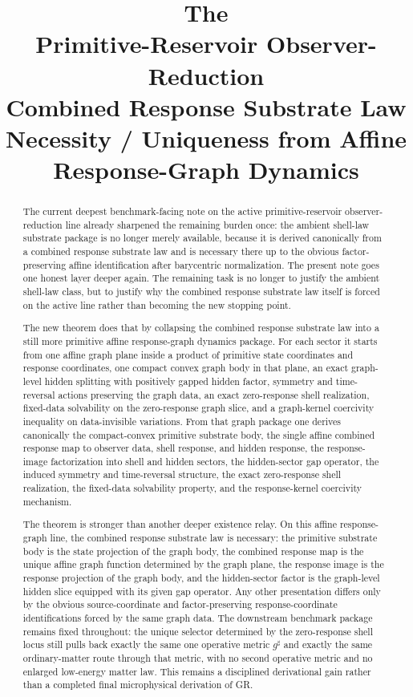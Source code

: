 \documentclass[11pt]{article}
\title{\textbf{The \TheoryName{}}\\[0.4em]
\large Primitive-Reservoir Observer-Reduction\\
\large Combined Response Substrate Law\\
\large Necessity / Uniqueness from Affine Response-Graph Dynamics}
\author{}
\date{}
\newcommand{\CompletedMetric}{g^{\sharp}}
\begin{document}
\maketitle

\begin{abstract}
The current deepest benchmark-facing note on the active primitive-reservoir observer-reduction line already sharpened the remaining burden once: the ambient shell-law substrate package is no longer merely available, because it is derived canonically from a combined response substrate law and is necessary there up to the obvious factor-preserving affine identification after barycentric normalization. The present note goes one honest layer deeper again. The remaining task is no longer to justify the ambient shell-law class, but to justify why the combined response substrate law itself is forced on the active line rather than becoming the new stopping point.

The new theorem does that by collapsing the combined response substrate law into a still more primitive affine response-graph dynamics package. For each sector it starts from one affine graph plane inside a product of primitive state coordinates and response coordinates, one compact convex graph body in that plane, an exact graph-level hidden splitting with positively gapped hidden factor, symmetry and time-reversal actions preserving the graph data, an exact zero-response shell realization, fixed-data solvability on the zero-response graph slice, and a graph-kernel coercivity inequality on data-invisible variations. From that graph package one derives canonically the compact-convex primitive substrate body, the single affine combined response map to observer data, shell response, and hidden response, the response-image factorization into shell and hidden sectors, the hidden-sector gap operator, the induced symmetry and time-reversal structure, the exact zero-response shell realization, the fixed-data solvability property, and the response-kernel coercivity mechanism.

The theorem is stronger than another deeper existence relay. On this affine response-graph line, the combined response substrate law is necessary: the primitive substrate body is the state projection of the graph body, the combined response map is the unique affine graph function determined by the graph plane, the response image is the response projection of the graph body, and the hidden-sector factor is the graph-level hidden slice equipped with its given gap operator. Any other presentation differs only by the obvious source-coordinate and factor-preserving response-coordinate identifications forced by the same graph data. The downstream benchmark package remains fixed throughout: the unique selector determined by the zero-response shell locus still pulls back exactly the same one operative metric \(\CompletedMetric\) and exactly the same ordinary-matter route through that metric, with no second operative metric and no enlarged low-energy matter law. This remains a disciplined derivational gain rather than a completed final microphysical derivation of GR.
\end{abstract}
\end{document}
